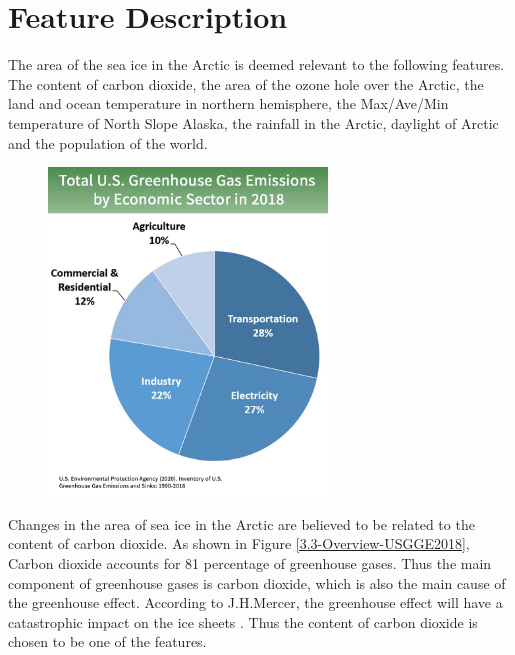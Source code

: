 \section{Feature Description} %

The area of the sea ice in the Arctic is deemed relevant to the following features. The content of carbon dioxide, the area of the ozone hole over the Arctic, the land and ocean temperature in northern hemisphere, the Max/Ave/Min temperature of North Slope Alaska, the rainfall in the Arctic, daylight of Arctic and the population of the world.

\begin{figure}[t]
\center
\includegraphics[width = 0.66\textwidth]{Figure/3.3-Overview-USGGE2018.jpg}
\end{figure}

Changes in the area of sea ice in the Arctic are believed to be related to the content of carbon dioxide. As shown in Figure \ref{3.3-Overview-USGGE2018}, Carbon dioxide accounts for 81 percentage of greenhouse gases. Thus the main component of greenhouse gases is carbon dioxide, which is also the main cause of the greenhouse effect. According to J.H.Mercer, the greenhouse effect will have a catastrophic impact on the ice sheets \cite{mercer1978west}. Thus the content of carbon dioxide is chosen to be one of the features.

